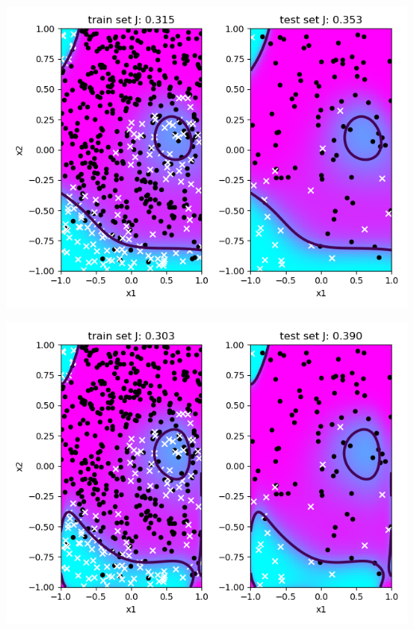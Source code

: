 \documentclass[a4paper]{article}
\begin{document}
\begin{enumerate}
\begin{minipage}[b]{0.4\textwidth}
 \captionsetup{justification=centering}
  \label{ad_gradient_descent_2_1_1000}
\end{minipage}
\begin{minipage}[b]{0.4\textwidth}
  \includegraphics[scale=0.35]{plots/ad_gradient_descent_5_1_1000.png}
 \captionsetup{justification=centering}
  \label{ad_gradient_descent_5_1_1000}
\end{minipage}
\hfill
\begin{minipage}[b]{0.4\textwidth}
  \includegraphics[scale=0.35]{plots/ad_gradient_descent_15_1_1000.png}

\end{minipage}
\end{enumerate}
\end{document}

